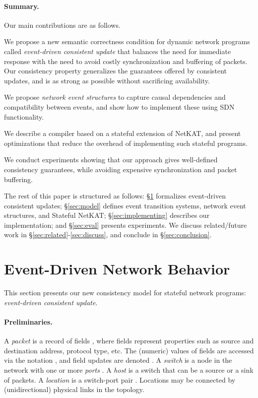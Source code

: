 \documentclass[pldi-cameraready]{sigplanconf}
\newcommand*\xmnote[3][0pt]{}
\begin{document}
\paragraph{Summary.}  
Our main contributions are as follows.
\begin{compactitem}
\item We propose a new semantic correctness condition for dynamic network programs called
  \emph{event-driven consistent update} that balances the need for
  immediate response with the need to avoid costly synchronization and
  buffering of packets.
Our consistency property
\xmnote{\FiveStar}{Q7}generalizes the guarantees offered by consistent updates, and
is as strong as possible without sacrificing availability.
\item We propose \emph{network event structures} to capture causal dependencies and compatibility
  between events, and show how to implement these using SDN functionality.
\item We describe a compiler based on a stateful extension of
  NetKAT, and present optimizations that reduce the overhead of
  implementing such stateful programs.
\item We conduct experiments showing that our approach gives
  well-defined consistency guarantees, while avoiding expensive
  synchronization and packet buffering.
\end{compactitem}

\vspace{2pt}
\noindent
The rest of this paper is structured as follows:
\S\ref{sec:consistency} formalizes event-driven consistent updates;
\S\ref{sec:model} defines event transition systems, network event
structures, and Stateful NetKAT; \S\ref{sec:implementing} describes
our implementation; and \S\ref{sec:eval} presents experiments.
We discuss related/future work in \S\ref{sec:related}-\ref{sec:discuss},
and conclude in \S\ref{sec:conclusion}.

\section{Event-Driven Network Behavior}
\label{sec:consistency}



This section presents our new consistency model for stateful network
programs: {\em event-driven consistent update}.

\paragraph*{Preliminaries.}
A {\em packet}  is a record of fields ,
where fields  represent properties such as source and
destination address, protocol type, etc. The (numeric) values of fields
are accessed via the notation , and field updates are denoted .
A {\em switch}
 is a node in the network with one or more {\em ports}
. A {\em host} is a switch that can be a source or a sink of
packets. A {\em location}  is a switch-port pair . Locations may
be connected by (unidirectional) physical links  in the topology.
\end{document}

